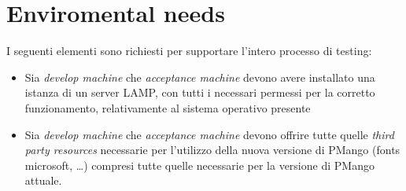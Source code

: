 \section{Enviromental needs}
I seguenti elementi sono richiesti per supportare l'intero processo di testing:
\begin{itemize}
  \item Sia \emph{develop machine} che \emph{acceptance machine} devono avere
  installato una istanza di un server LAMP, con tutti i necessari permessi per la corretto
  funzionamento, relativamente al sistema operativo presente
  \item Sia \emph{develop machine} che \emph{acceptance machine} devono offrire
  tutte quelle \emph{third party resources} necessarie per l'utilizzo della
  nuova versione di PMango (fonts microsoft, \ldots) compresi tutte quelle
  necessarie per la versione di PMango attuale.
\end{itemize}
